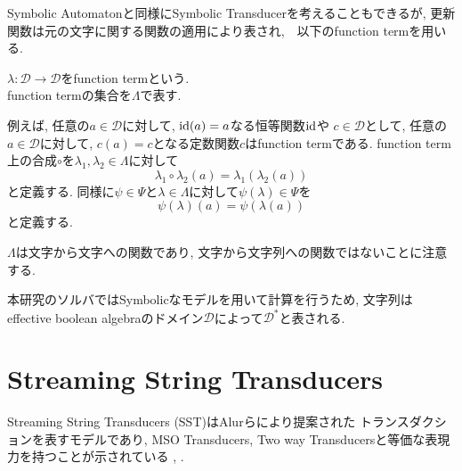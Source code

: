 \documentclass[uplatex,dvipdfmx,a4j]{jsreport}
\begin{document}
  Symbolic Automatonと同様にSymbolic Transducerを考えることもできるが,
  更新関数は元の文字に関する関数の適用により表され,　以下のfunction termを用いる.

  \begin{definition}
    $\lambda: \mathcal{D} \rightarrow \mathcal{D}$をfunction termという. \\
    function termの集合を$\Lambda$で表す.
  \end{definition}

  例えば, 任意の$a \in \mathcal{D}$に対して, $\mbox{id}(a) = a$なる恒等関数$\mbox{id}$や
  $c \in \mathcal{D}$として,
  任意の$a \in \mathcal{D}$に対して, $c(a) = c$となる定数関数$c$はfunction termである.
  function term上の合成$\circ$を$\lambda_1, \lambda_2 \in \Lambda$に対して
  \[
    \lambda_1 \circ \lambda_2 (a) = \lambda_1(\lambda_2(a))
  \]
  と定義する.
  同様に$\psi \in \Psi$と$\lambda \in \Lambda$に対して$\psi(\lambda) \in \Psi$を
  \[
    \psi(\lambda)(a) = \psi(\lambda(a))
  \]
  と定義する.

  $\Lambda$は文字から文字への関数であり, 文字から文字列への関数ではないことに注意する.

  本研究のソルバではSymbolicなモデルを用いて計算を行うため,
  文字列はeffective boolean algebraのドメイン$\mathcal{D}$によって$\mathcal{D}^*$と表される.

  \section{Streaming String Transducers}

  Streaming String Transducers (SST)\cite{alur2011streaming}はAlurらにより提案された
  トランスダクションを表すモデルであり,
  MSO Transducers, Two way Transducers\cite{engelfriet2001mso}と等価な表現力を持つことが示されている
  \cite{alur_et_al:LIPIcs:2010:2853}, \cite{alur2011nondeterministic}.
\end{document}
